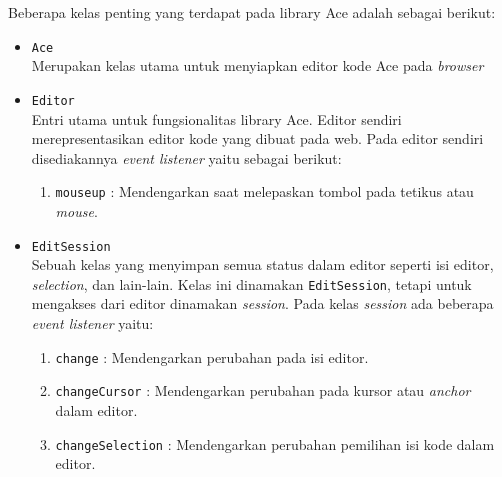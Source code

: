 \documentclass[a4paper,twoside]{article}
\begin{document}
\begin{enumerate}
	      Beberapa kelas penting yang terdapat pada library Ace adalah sebagai berikut:

	      \begin{itemize}
		      \item \verb|Ace| \\
		            Merupakan kelas utama untuk menyiapkan editor kode Ace pada \textit{browser}
		      \item \verb|Editor| \\
		            Entri utama untuk fungsionalitas library Ace. Editor sendiri merepresentasikan editor kode yang dibuat pada web. Pada editor sendiri disediakannya \textit{event listener} yaitu sebagai berikut:

		            \begin{enumerate}
			            \item \verb|mouseup| : Mendengarkan saat melepaskan tombol pada tetikus atau \textit{mouse}.
		            \end{enumerate}

		      \item \verb|EditSession| \\
		            Sebuah kelas yang menyimpan semua status dalam editor seperti isi editor, \textit{selection}, dan lain-lain. Kelas ini dinamakan \verb|EditSession|, tetapi untuk mengakses dari editor dinamakan \textit{session}. Pada kelas \textit{session} ada beberapa \textit{event listener} yaitu:

		            \begin{enumerate}
			            \item \verb|change| : Mendengarkan perubahan pada isi editor.
			            \item \verb|changeCursor| : Mendengarkan perubahan pada kursor atau \textit{anchor} dalam editor.
			            \item \verb|changeSelection| : Mendengarkan perubahan pemilihan isi kode dalam editor.
		            \end{enumerate}


\end{itemize}
\end{enumerate}
\end{document}
